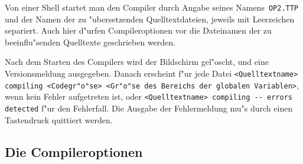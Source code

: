 Von einer Shell startet man den Compiler durch Angabe seines Namens~{\tt OP2.TTP}
und der Namen der zu "ubersetzenden Quelltextdateien, jeweils mit Leerzeichen
separiert.
Auch hier d"urfen Compileroptionen vor die Dateinamen der zu beeinflu"senden
Quelltexte geschrieben werden.

Nach dem Starten des Compilers wird der Bildschirm gel"oscht, und eine Versionsmeldung
ausgegeben.
Danach erscheint f"ur jede Datei {\tt <Quelltextname> compiling <Codegr"o"se> <Gr"o"se des Bereichs der globalen Variablen>},
wenn kein Fehler aufgetreten ist, oder {\tt <Quelltextname> compiling -{}- errors detected}
f"ur den Fehlerfall.
Die Ausgabe der Fehlermeldung mu"s durch einen Tastendruck quittiert werden.

\subsection{Die Compileroptionen}

